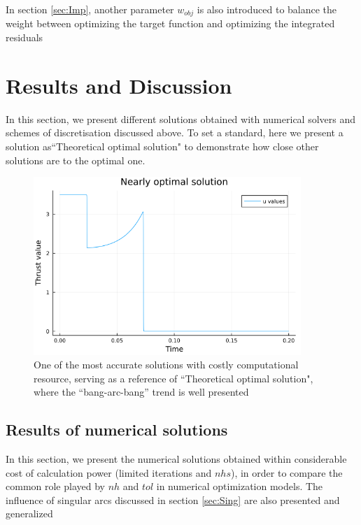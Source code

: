 \documentclass{article}
\begin{document}
In section \ref{sec:Imp}, another parameter $w_{obj}$ is also introduced to balance the weight between optimizing the target function and optimizing the integrated residuals
\clearpage

\section{Results and Discussion}
In this section, we present different solutions obtained with numerical solvers and schemes of discretisation discussed above. To set a standard, here we present a solution as``Theoretical optimal solution" to demonstrate how close other solutions are to the optimal one. 

\begin{figure}[ht]
    \centering
    \includegraphics[width=0.9\textwidth]{Nearly Optimal.png}
    \caption{\label{fig:opt} One of the most accurate solutions with costly computational resource, serving as a reference of ``Theoretical optimal solution", where the ``bang-arc-bang'' trend is well presented}
\end{figure}

\subsection{Results of numerical solutions}
In this section, we present the numerical solutions obtained within considerable cost of calculation power (limited iterations and $nhs$), in order to compare the common role played by $nh$ and $tol$ in numerical optimization models. The influence of singular arcs discussed in section \ref{sec:Sing} are also presented and generalized
\end{document}
